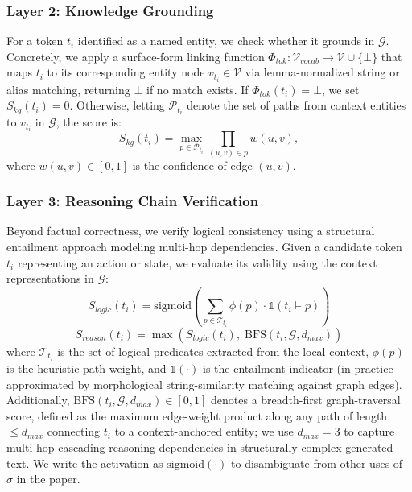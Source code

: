 \subsubsection{Layer 2: Knowledge Grounding}
For a token $t_i$ identified as a named entity, we check whether it grounds in $\mathcal{G}$. Concretely, we apply a surface-form linking function $\Phi_{tok}: \mathcal{V}_{vocab} \to \mathcal{V} \cup \{\bot\}$ that maps $t_i$ to its corresponding entity node $v_{t_i} \in \mathcal{V}$ via lemma-normalized string or alias matching, returning $\bot$ if no match exists. If $\Phi_{tok}(t_i) = \bot$, we set $S_{kg}(t_i) = 0$. Otherwise, letting $\mathcal{P}_{t_i}$ denote the set of paths from context entities to $v_{t_i}$ in $\mathcal{G}$, the score is:
\begin{equation}
S_{kg}(t_i) = \max_{p \in \mathcal{P}_{t_i}} \prod_{(u,v) \in p} w(u,v),
\end{equation}
where $w(u,v) \in [0,1]$ is the confidence of edge $(u,v)$.

\subsubsection{Layer 3: Reasoning Chain Verification}
\label{sec:layer3}
Beyond factual correctness, we verify logical consistency using a structural entailment approach modeling multi-hop dependencies. Given a candidate token $t_i$ representing an action or state, we evaluate its validity using the context representations in $\mathcal{G}$:
\begin{equation}
S_{logic}(t_i) = \mathrm{sigmoid}\!\left( \sum_{p \in \mathcal{T}_{t_i}} \phi(p) \cdot \mathbb{1}(t_i \models p) \right)
\end{equation}
\begin{equation}
S_{reason}(t_i) = \max \!\left( S_{logic}(t_i),\; \mathrm{BFS}(t_i, \mathcal{G}, d_{max}) \right)
\end{equation}
where $\mathcal{T}_{t_i}$ is the set of logical predicates extracted from the local context, $\phi(p)$ is the heuristic path weight, and $\mathbb{1}(\cdot)$ is the entailment indicator (in practice approximated by morphological string-similarity matching against graph edges). Additionally, $\mathrm{BFS}(t_i, \mathcal{G}, d_{max}) \in [0,1]$ denotes a breadth-first graph-traversal score, defined as the maximum edge-weight product along any path of length $\leq d_{max}$ connecting $t_i$ to a context-anchored entity; we use $d_{max}=3$ to capture multi-hop cascading reasoning dependencies in structurally complex generated text. We write the activation as $\mathrm{sigmoid}(\cdot)$ to disambiguate from other uses of $\sigma$ in the paper.


